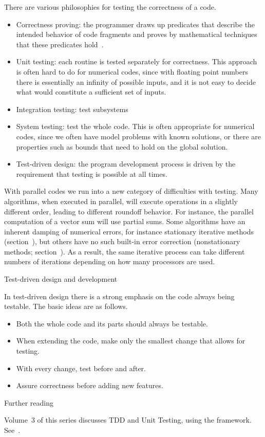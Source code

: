 There are various philosophies for testing the correctness of a code.
\begin{itemize}
\item Correctness proving: the programmer draws up predicates that
  describe the intended behavior of code fragments and proves by
  mathematical techniques that these predicates
  hold~\cite{Hoare1969axiomatic,Dijkstra1974Programming}.
\item Unit testing: each routine is tested separately for
  correctness. This approach is often hard to do for numerical codes,
  since with floating point numbers there is essentially an infinity
  of possible inputs, and it is not easy to decide what would
  constitute a sufficient
  set of inputs.
\item Integration testing: test subsystems
\item System testing: test the whole code. This is often appropriate
  for numerical codes, since we often have model problems with known
  solutions, or there are properties such as bounds that need to hold
  on the global solution.
\item Test-driven design: the program development process is driven by
  the requirement that testing is possible at all times.
\end{itemize}

With parallel codes we run into a new category of difficulties with
testing. Many algorithms, when executed in parallel, will execute
operations in a slightly different order, leading to different
roundoff behavior. For instance, the parallel computation of a vector
sum will use partial sums. Some algorithms have an inherent damping of
numerical errors, for instance stationary iterative methods
(section~), but others have no such built-in error
correction (nonstationary methods;
section~). As a result, the same iterative
process can take different numbers of iterations depending on how many
processors are used.
 
 {Test-driven design and development}

In test-driven design there is a strong emphasis on the code always
being testable. The basic ideas are as follows.
\begin{itemize}
\item Both the whole code and its parts should always be testable.
\item When extending the code, make only the smallest change that
  allows for testing.
\item With every change, test before and after.
\item Assure correctness before adding new features.
\end{itemize}

 {Further reading}

Volume~3 of this series discusses \ac{TDD} and Unit Testing, using the
 framework. See~.


